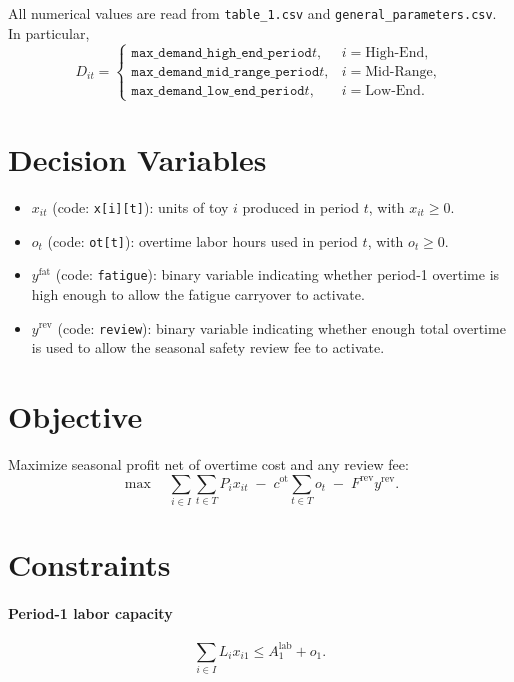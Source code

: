 All numerical values are read from \texttt{table\_1.csv} and \texttt{general\_parameters.csv}. In particular,
\[
D_{it}=
\begin{cases}
\texttt{max\_demand\_high\_end\_period}t,& i=\text{High-End},\\
\texttt{max\_demand\_mid\_range\_period}t,& i=\text{Mid-Range},\\
\texttt{max\_demand\_low\_end\_period}t,& i=\text{Low-End}.
\end{cases}
\]

\section*{Decision Variables}

\begin{itemize}
    \item $x_{it}$ (code: \texttt{x[i][t]}): units of toy $i$ produced in period $t$, with $x_{it}\ge 0$.
    \item $o_t$ (code: \texttt{ot[t]}): overtime labor hours used in period $t$, with $o_t\ge 0$.
    \item $y^{\text{fat}}$ (code: \texttt{fatigue}): binary variable indicating whether period-1 overtime is high enough to allow the fatigue carryover to activate.
    \item $y^{\text{rev}}$ (code: \texttt{review}): binary variable indicating whether enough total overtime is used to allow the seasonal safety review fee to activate.
\end{itemize}

\section*{Objective}

Maximize seasonal profit net of overtime cost and any review fee:
\[
\max \quad
\sum_{i\in I}\sum_{t\in T} P_i x_{it}
\;-\;
c^{\text{ot}}\sum_{t\in T} o_t
\;-\;
F^{\text{rev}} y^{\text{rev}}.
\]

\section*{Constraints}

\paragraph{Period-1 labor capacity}
\[
\sum_{i\in I} L_i x_{i1} \le A^{\text{lab}}_1 + o_1.
\]


